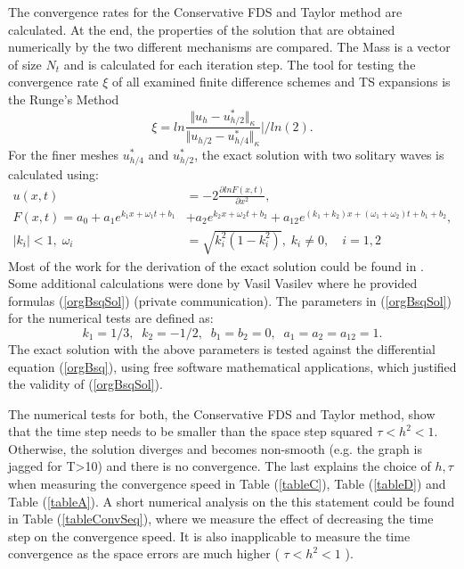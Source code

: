 \documentclass[%
 aip,
cp,  
 amsmath,amssymb,
 reprint,
]{iopconfser}
\newcommand{\be}{\begin{equation}}
\newcommand{\ee}{\end{equation}}
\newcommand{\rf}[1]{(\ref{#1})}
\begin{document}
The convergence rates for the Conservative FDS and Taylor method are calculated. At the end, the properties of the solution that are obtained numerically by the two different mechanisms are compared. The Mass is a vector of size $N_t$ and is calculated for each iteration step. The tool for testing the convergence rate $\xi$ of all examined finite difference schemes and TS expansions is the Runge's Method
\begin{equation}\label{Runge}
\xi = ln  \frac{\Vert u_{h} - u^*_{h/2} \Vert_\kappa } {\Vert  u_{h/2} - u^*_{h/4} \Vert_\kappa  } | / ln(2).
\end{equation}
For the finer meshes $u^*_{h/4}$ and $u^*_{h/2}$, the exact solution with two solitary waves is calculated using:
\begin{align}\label{orgBsqSol}
u(x,t) &= -2 \frac{\partial ln F(x,t)}{\partial x^2},
\\
 F(x,t) = a_0 + a_1 e^{k_1 x + \omega_1 t + b_1} &+ a_2 e^{k_2 x + \omega_2 t + b_2}  + a_{12} e^{(k_1 + k_2) x + (\omega_1 + \omega_2)  t + b_1 + b_2}, \nonumber
\\
|k_i| < 1, \; \omega_i &= \sqrt{k^2_i(1-k^2_i) }, \; k_i \neq 0, \quad i = 1,2 \nonumber
\end{align}
Most of the work for the derivation of the exact solution could be found in \cite{exactSol1, exactSol2}. Some additional calculations were done by Vasil Vasilev where he provided formulas \rf{orgBsqSol} (private communication). 
The parameters in \rf{orgBsqSol} for the numerical tests are defined as:
\be
        k_1 = 1/3,  \;\; k_2 = -1/2,  \;\; b_1 = b_2 = 0,  \;\; a_1 = a_2 = a_{12} = 1.
\ee
The exact solution with the above parameters is tested against the differential equation \rf{orgBsq}, using free software mathematical applications, which justified the validity of \rf{orgBsqSol}.

The numerical tests for both, the Conservative FDS and Taylor method, show that the time step needs to be smaller than the space step squared $\tau < h^2 < 1$. Otherwise, the solution diverges and becomes non-smooth (e.g. the graph is jagged for T>10) and there is no convergence. The last explains the choice of $h, \tau$ when measuring the convergence speed in Table \rf{tableC}, Table \rf{tableD} and Table \rf{tableA}. A short numerical analysis on the this statement could be found in Table \rf{tableConvSeq}, where we measure the effect of decreasing the time step on the convergence speed. It is also inapplicable to measure the time convergence as the space errors are much higher ( $\tau < h^2 < 1$ ).
\end{document}
